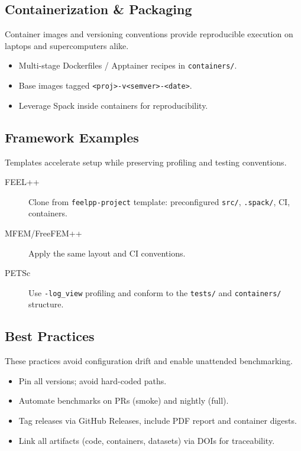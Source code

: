 \subsection{Containerization \& Packaging}
Container images and versioning conventions provide reproducible execution on laptops and supercomputers alike.
\begin{itemize}
  \item Multi-stage Dockerfiles / Apptainer recipes in \texttt{containers/}.
  \item Base images tagged \texttt{<proj>-v<semver>-<date>}.
  \item Leverage Spack inside containers for reproducibility.
\end{itemize}

\subsection{Framework Examples}
Templates accelerate setup while preserving profiling and testing conventions.
\begin{description}
  \item[FEEL++] Clone from \texttt{feelpp-project} template: preconfigured \texttt{src/}, \texttt{.spack/}, CI, containers.
  \item[MFEM/FreeFEM++] Apply the same layout and CI conventions.
  \item[PETSc] Use \texttt{-log\_view} profiling and conform to the \texttt{tests/} and \texttt{containers/} structure.
\end{description}

\subsection{Best Practices}
These practices avoid configuration drift and enable unattended benchmarking.
\begin{itemize}
  \item Pin all versions; avoid hard-coded paths.
  \item Automate benchmarks on PRs (smoke) and nightly (full).
  \item Tag releases via GitHub Releases, include PDF report and container digests.
  \item Link all artifacts (code, containers, datasets) via DOIs for traceability.
\end{itemize}